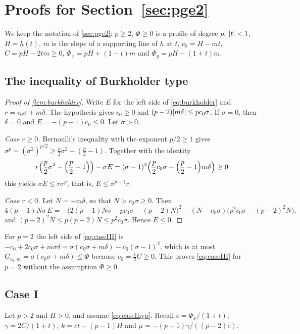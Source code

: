 \section{Proofs for Section~\ref{sec:pge2}}\label{app:pge2}

We keep the notation of \cref{sec:pge2}: $p\ge2$, $\Phi\ge0$ is a profile of degree $p$,
$\lvert t\rvert<1$, $H=h(t)$, $m$ is the slope of a supporting line of $h$ at $t$, $c_0=H-mt$,
$C=pH-2tm\ge0$, $\Phi_x=pH+(1-t)m$ and $\Phi_y=pH-(1+t)m$.

\subsection{The inequality of Burkholder type}

\begin{proof}[Proof of \cref{lem:burkholder}]
Write $E$ for the left side of \eqref{eq:burkholder} and $r=c_0\sigma+m\delta$. The hypothesis
gives $c_0\ge0$ and $(p-2)\lvert m\delta\rvert\le pc_0\sigma$. If $\sigma=0$, then $\delta=0$ and
$E=-(p-1)c_0\le0$. Let $\sigma>0$.

\emph{Case $r\ge0$.} Bernoulli's inequality with the exponent $p/2\ge1$ gives
$\sigma^p=(\sigma^2)^{p/2}\ge\tfrac p2\sigma^2-(\tfrac p2-1)$. Together with the identity
\[
  r\Bigl(\frac p2\sigma^2-\Bigl(\frac p2-1\Bigr)\Bigr)-\sigma E
  =(\sigma-1)^2\Bigl(\frac p2c_0\sigma-\Bigl(\frac p2-1\Bigr)m\delta\Bigr)\ge0
\]
this yields $\sigma E\le r\sigma^p$, that is, $E\le\sigma^{p-1}r$.

\emph{Case $r<0$.} Let $N=-m\delta$, so that $N>c_0\sigma\ge0$. Then
\[
  4(p-1)N\sigma\,E=-\bigl(2(p-1)N\sigma-pc_0\sigma-(p-2)N\bigr)^2
  -(N-c_0\sigma)\bigl(p^2c_0\sigma-(p-2)^2N\bigr),
\]
and $(p-2)^2N\le p(p-2)N\le p^2c_0\sigma$. Hence $E\le0$.
\end{proof}

For $p=2$ the left side of \eqref{eq:caseIII} is
$-c_0+2c_0\sigma+m\sigma\delta=\sigma(c_0\sigma+m\delta)-c_0(\sigma-1)^2$, which is at most
$G_{c_0,m}=\sigma(c_0\sigma+m\delta)\le\Phi$ because $c_0=\tfrac12C\ge0$. This proves
\eqref{eq:caseIII} for $p=2$ without the assumption $\Phi\ge0$.

\subsection{Case I}

Let $p>2$ and $H>0$, and assume \eqref{eq:caseIhyp}. Recall
$c=\Phi_x/(1+t)$, $\gamma=2C/(1+t)$, $k=ct-(p-1)H$ and $\mu=-(p-1)\gamma/((p-2)c)$.

